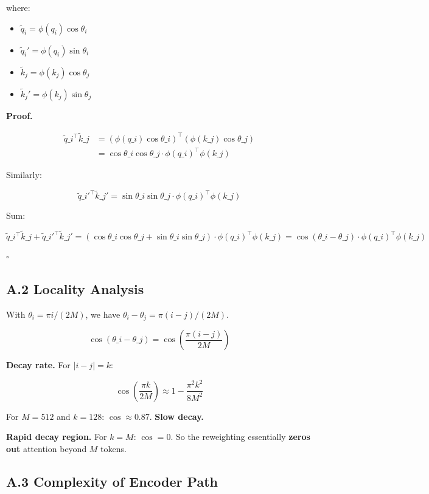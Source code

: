 where:
\begin{itemize}
\item $\tilde{q}_i = \phi(q_i) \cos\theta_i$
\item $\tilde{q}_i' = \phi(q_i) \sin\theta_i$
\item $\tilde{k}_j = \phi(k_j) \cos\theta_j$
\item $\tilde{k}_j' = \phi(k_j) \sin\theta_j$

\end{itemize}
\textbf{Proof.}

\[
\begin{aligned}
\tilde{q}\_i^\top \tilde{k}\_j &= (\phi(q\_i) \cos\theta\_i)^\top (\phi(k\_j) \cos\theta\_j) \\
&= \cos\theta\_i \cos\theta\_j \cdot \phi(q\_i)^\top \phi(k\_j)
\end{aligned}
\]

Similarly:

\[
\tilde{q}\_i'^\top \tilde{k}\_j' = \sin\theta\_i \sin\theta\_j \cdot \phi(q\_i)^\top \phi(k\_j)
\]

Sum:

\[
\tilde{q}\_i^\top \tilde{k}\_j + \tilde{q}\_i'^\top \tilde{k}\_j' = (\cos\theta\_i \cos\theta\_j + \sin\theta\_i \sin\theta\_j) \cdot \phi(q\_i)^\top \phi(k\_j) = \cos(\theta\_i - \theta\_j) \cdot \phi(q\_i)^\top \phi(k\_j)
\]

$\square$

\subsection{A.2 Locality Analysis}

With $\theta_i = \pi i / (2 M)$, we have $\theta_i - \theta_j = \pi (i - j) / (2 M)$.

\[
\cos(\theta\_i - \theta\_j) = \cos\!\left(\frac{\pi (i-j)}{2M}\right)
\]

\textbf{Decay rate.} For $|i - j| = k$:

\[
\cos\!\left(\frac{\pi k}{2M}\right) \approx 1 - \frac{\pi^2 k^2}{8M^2}
\]

For $M = 512$ and $k = 128$: $\cos \approx 0.87$. \textbf{Slow decay.}

\textbf{Rapid decay region.} For $k = M$: $\cos = 0$. So the reweighting 
essentially \textbf{zeros out} attention beyond $M$ tokens.

\subsection{A.3 Complexity of Encoder Path}

